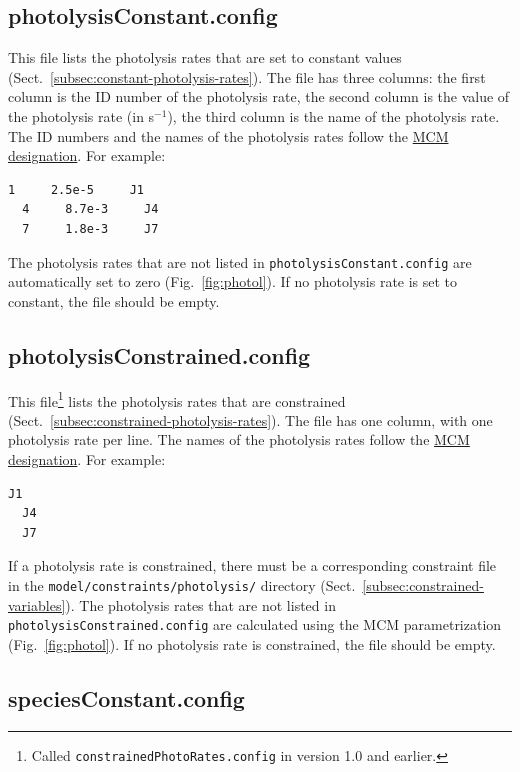 \subsection{photolysisConstant.config} \label{subsec:photolysisconstant}

This file lists the photolysis rates that are set to constant values
(Sect.~\ref{subsec:constant-photolysis-rates}). The file has three columns: the first column is
the ID number of the photolysis rate, the second column is the value of the photolysis rate (in
s$^{-1}$), the third column is the name of the photolysis rate. The ID numbers and the names of
the photolysis rates follow the \href{https://mcm.york.ac.uk/MCM/rates/photolysis}{MCM
  designation}. For example:

\begin{Verbatim}[fontsize=\small]
  1     2.5e-5     J1
  4     8.7e-3     J4
  7     1.8e-3     J7
\end{Verbatim}

The photolysis rates that are not listed in \texttt{photolysisConstant.config} are
automatically set to zero (Fig.~\ref{fig:photol}). If no photolysis rate is set to constant,
the file should be empty.

\subsection{photolysisConstrained.config} \label{subsec:photolysisconstrained}

This file\footnote{Called \texttt{constrainedPhotoRates.config} in version 1.0 and earlier.}
lists the photolysis rates that are constrained (Sect.~\ref{subsec:constrained-photolysis-rates}).
The file has one column, with one photolysis rate per line. The names of the photolysis rates
follow the \href{https://mcm.york.ac.uk/MCM/rates/photolysis}{MCM designation}. For example:

\begin{Verbatim}[fontsize=\small]
  J1
  J4
  J7
\end{Verbatim}

If a photolysis rate is constrained, there must be a corresponding constraint file in the
\texttt{model/constraints/photolysis/} directory (Sect.~\ref{subsec:constrained-variables}).
The photolysis rates that are not listed in \texttt{photolysisConstrained.config} are
calculated using the MCM parametrization (Fig.~\ref{fig:photol}). If no photolysis rate is
constrained, the file should be empty.

\subsection{speciesConstant.config} \label{subsec:speciesconstant}

